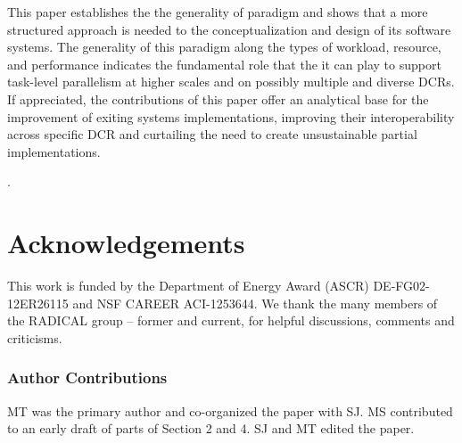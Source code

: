 \documentclass{sig-alternate}
\begin{document}
This paper establishes the the generality of \pilot paradigm and shows that a
more structured approach is needed to the conceptualization
and design of its software systems.
The generality of this paradigm along the types of workload, resource, and
performance indicates the fundamental role that the it can play to support
task-level parallelism at higher scales and on possibly multiple and diverse
DCRs. If appreciated, the contributions of this paper offer an analytical base
for the improvement of exiting \pilot systems implementations, improving their
interoperability across specific DCR and curtailing the need to create
unsustainable partial implementations.

.




%

%

%
\section*{Acknowledgements}

{\footnotesize{This work is funded by the Department of Energy Award (ASCR)
DE-FG02-12ER26115 and NSF CAREER ACI-1253644. We thank the many members of the
RADICAL group -- former and current, for helpful discussions, comments and
criticisms.}}

\subsubsection*{Author Contributions} MT was the primary author and co-organized
the paper with SJ. MS contributed to an early draft of parts of Section 2 and 4.
SJ and MT edited the paper.



%


\end{document}
